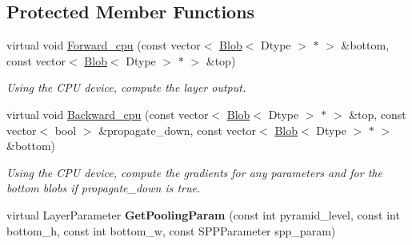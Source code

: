 \subsection*{Protected Member Functions}
\begin{DoxyCompactItemize}
\item 
virtual void \hyperlink{classcaffe_1_1SPPLayer_a47c6a647030121c813845c657744547c}{Forward\+\_\+cpu} (const vector$<$ \hyperlink{classcaffe_1_1Blob}{Blob}$<$ Dtype $>$ $\ast$ $>$ \&bottom, const vector$<$ \hyperlink{classcaffe_1_1Blob}{Blob}$<$ Dtype $>$ $\ast$ $>$ \&top)\hypertarget{classcaffe_1_1SPPLayer_a47c6a647030121c813845c657744547c}{}\label{classcaffe_1_1SPPLayer_a47c6a647030121c813845c657744547c}

\begin{DoxyCompactList}\small\item\em Using the C\+PU device, compute the layer output. \end{DoxyCompactList}\item 
virtual void \hyperlink{classcaffe_1_1SPPLayer_abf8677b68b68fb7c3c85f347d2bacc5d}{Backward\+\_\+cpu} (const vector$<$ \hyperlink{classcaffe_1_1Blob}{Blob}$<$ Dtype $>$ $\ast$ $>$ \&top, const vector$<$ bool $>$ \&propagate\+\_\+down, const vector$<$ \hyperlink{classcaffe_1_1Blob}{Blob}$<$ Dtype $>$ $\ast$ $>$ \&bottom)\hypertarget{classcaffe_1_1SPPLayer_abf8677b68b68fb7c3c85f347d2bacc5d}{}\label{classcaffe_1_1SPPLayer_abf8677b68b68fb7c3c85f347d2bacc5d}

\begin{DoxyCompactList}\small\item\em Using the C\+PU device, compute the gradients for any parameters and for the bottom blobs if propagate\+\_\+down is true. \end{DoxyCompactList}\item 
virtual Layer\+Parameter {\bfseries Get\+Pooling\+Param} (const int pyramid\+\_\+level, const int bottom\+\_\+h, const int bottom\+\_\+w, const S\+P\+P\+Parameter spp\+\_\+param)\hypertarget{classcaffe_1_1SPPLayer_ad3610c7dae250bac8f31c71dc3d6bb2d}{}\label{classcaffe_1_1SPPLayer_ad3610c7dae250bac8f31c71dc3d6bb2d}

\end{DoxyCompactItemize}

